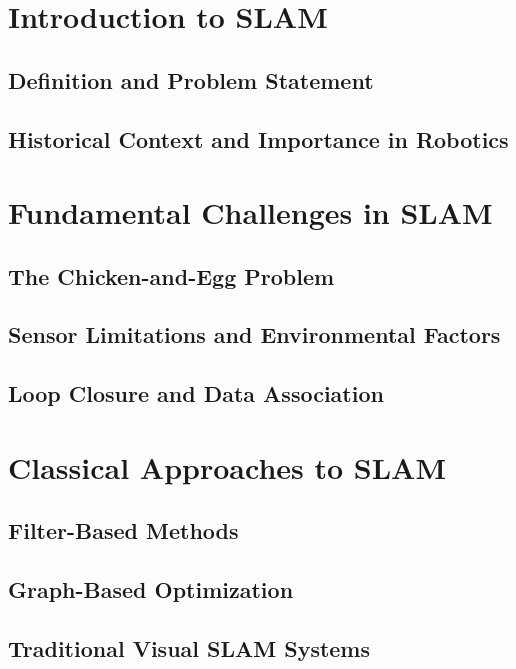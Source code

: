 \documentclass[12pt]{article}
\begin{document}
    \newpage

    \tableofcontents


    \section{Introduction to SLAM}
    \subsection{Definition and Problem Statement}
    \subsection{Historical Context and Importance in Robotics}

    \section{Fundamental Challenges in SLAM}
    \subsection{The Chicken-and-Egg Problem}
    \subsection{Sensor Limitations and Environmental Factors}
    \subsection{Loop Closure and Data Association}

    \section{Classical Approaches to SLAM}
    \subsection{Filter-Based Methods}
    \subsection{Graph-Based Optimization}
    \subsection{Traditional Visual SLAM Systems}
\end{document}
